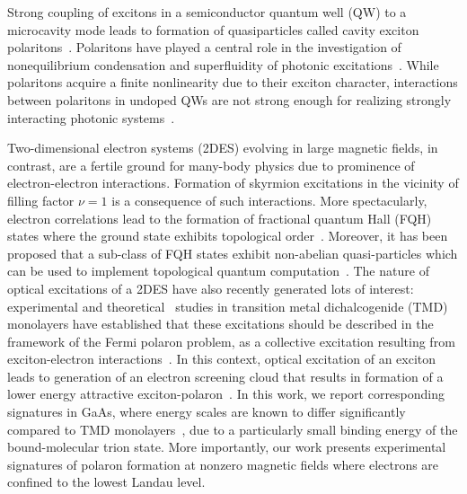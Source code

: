 \documentclass[prl,twocolumn,10pt,showpacs,superscriptaddress,longbibliography,footnoteinbib]{revtex4-1}
\begin{document}

\maketitle

Strong coupling of excitons in a semiconductor quantum well (QW) to a microcavity mode leads to formation of quasiparticles called cavity exciton polaritons~\cite{Weisbuch1992}. Polaritons have played a central role in the investigation of nonequilibrium condensation and superfluidity of photonic excitations~\cite{Deng2010,Carusotto2013}. While polaritons acquire a finite nonlinearity due to their exciton character, interactions between polaritons in undoped QWs are not strong enough for realizing strongly interacting photonic systems~\cite{Amo2016}.

Two-dimensional electron systems (2DES) evolving in large magnetic fields, in contrast, are a fertile ground for many-body physics due to prominence of electron-electron interactions. Formation of skyrmion excitations in the vicinity of filling factor $\nu = 1$ is a consequence of such interactions. More spectacularly, electron correlations lead to the formation of fractional quantum Hall (FQH) states where the ground state exhibits topological order~\cite{Prange1989,DasSarma1997,Sondhi1997}. Moreover, it has been proposed that a sub-class of FQH states exhibit non-abelian quasi-particles which can be used to implement topological quantum computation~\cite{Nayak2008}. The nature of optical excitations of a 2DES have also recently generated lots of interest: experimental and theoretical~\cite{Sidler2017,Efimkin2016} studies in transition metal dichalcogenide (TMD) monolayers have established that these excitations should be described in the framework of the Fermi polaron problem, as a collective excitation resulting from exciton-electron interactions~\cite{Schirotzek2009,Koschorreck2012,Schmidt2012,Massignan2014}. In this context, optical excitation of an exciton leads to generation of an electron screening cloud that results in formation of a lower energy attractive exciton-polaron~\cite{Sidler2017,Efimkin2016}. In this work, we report corresponding signatures in GaAs, where energy scales are known to differ significantly compared to TMD monolayers~\cite{Koudinov2014,Suris2003}, due to a particularly small binding energy of the bound-molecular trion state. More importantly, our work presents experimental signatures of polaron formation at nonzero magnetic fields where electrons are confined to the lowest Landau level.
\end{document}
